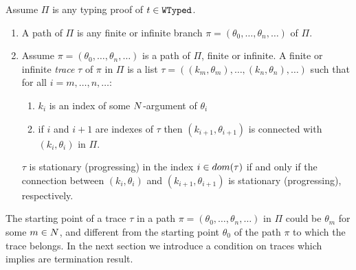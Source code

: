 \begin{definition}
\label{definition-progressing-trace}
Assume $\Pi$ is any typing proof of $t \in {\tt WTyped}$.
\begin{enumerate}
\item
A path of $\Pi$ is any finite or infinite branch $\pi =(\theta_0, \ldots, \theta_n, \ldots)$ of $\Pi$.
\item
Assume $\pi =(\theta_0, \ldots, \theta_n, \ldots)$ is a path of $\Pi$, finite or infinite. 
A finite or infinite \emph{trace} $\tau$ of $\pi$ in $\Pi$ is a list 
$\tau =( (k_m,\theta_m), \ldots, (k_n,\theta_n), \ldots)$ such that for all $i=m,\ldots, n,\ldots$:
\begin{enumerate}
\item
$k_i$ is an index of some ${N}$-argument of $\theta_i$
\item
if $i$ and $i+1$ are indexes of $\tau$ then $(k_{i+1},\theta_{i+1})$ 
is connected with $(k_i, \theta_i)$ in $\Pi$.
\end{enumerate}
$\tau$ is stationary (progressing) in the index $i \in {{\relax dom}}(\tau)$ if and only if the connection 
between $(k_i,\theta_i)$ and $(k_{i+1},\theta_{i+1})$ is stationary (progressing),
respectively.
\end{enumerate}
\end{definition}

The starting point of a trace $\tau$ in a path  $\pi =(\theta_0, \ldots, \theta_n, \ldots)$
in $\Pi$ could be $\theta_m$ for some $m \in {N}$, 
and different from the starting point $\theta_0$ of the path $\pi$ to which the 
trace belongs. 
In the next section we introduce a condition on traces which implies are termination result.

